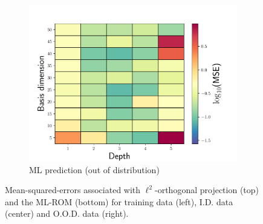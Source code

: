\documentclass[3p,computermodern,10pt]{elsarticle}
\begin{document}
\begin{figure}
\begin{center}
\begin{subfigure}[t]{0.32\textwidth}
\includegraphics[trim={0cm 0cm 0cm 0cm},clip,width=1.0\linewidth]{code/burgers/synapse_models/basis_study/MSE_testing_ML.pdf}
\caption{ML prediction (out of distribution)}
\end{subfigure}
\caption{Mean-squared-errors associated with $\ell^2$-orthogonal projection (top) and the ML-ROM (bottom) for training data (left), I.D. data (center) and O.O.D. data (right).}
\label{fig:burg_training_test_projection_mse}
\end{center}
\end{figure}
\end{document}
